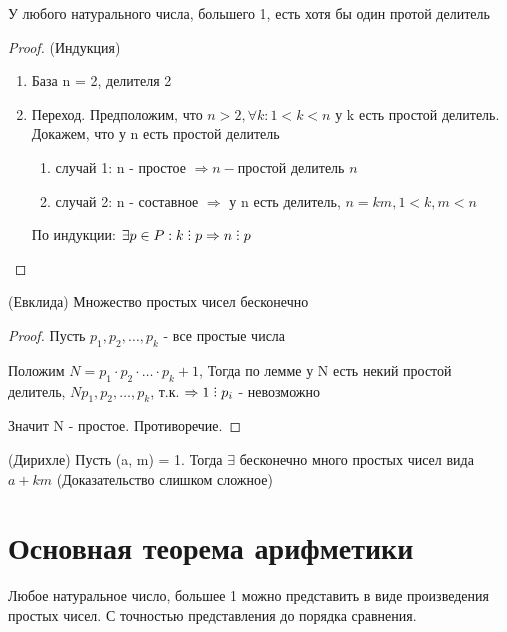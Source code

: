 \begin{lemma}
  У любого натурального числа, большего 1, есть хотя бы один протой делитель
\end{lemma}

\begin{proof} (Индукция)
  \begin{enumerate}
    \item База n = 2, делителя 2
    \item Переход. Предположим, что $ n > 2, \forall k: 1 < k < n$ у k есть простой делитель. Докажем, что у n есть простой делитель
    
    \begin{enumerate}
      \item случай 1: n - простое $\Rightarrow n - \text{простой делитель } n$
      \item случай 2: n - составное $\Rightarrow$ у n есть делитель, $n = km, 1 < k, m < n$
    \end{enumerate}

    По индукции: $\exists p \in P: k \divby p \Rightarrow n \divby p$
  \end{enumerate}
\end{proof}

\begin{theorem} (Евклида)
  Множество простых чисел бесконечно
\end{theorem}

\begin{proof}
  Пусть $p_1, p_2, \ldots, p_k$ - все простые числа

  Положим $N = p_1 \cdot p_2 \cdot \ldots \cdot p_k + 1$, Тогда по лемме у N есть некий простой делитель,  $N p_1, p_2, \ldots, p_k$, т.к. $\Rightarrow 1 \divby p_i$ - невозможно

  Значит N - простое. Противоречие.

\end{proof}

\begin{theorem} (Дирихле)
  Пусть (a, m) = 1. Тогда $\exists$ бесконечно много простых чисел вида $a + km$ (Доказательство слишком сложное)
\end{theorem}

\section{Основная теорема арифметики}

\begin{theorem}
  Любое натуральное число, большее 1 можно представить в виде произведения простых чисел. С точностью представления до порядка сравнения.
\end{theorem}


